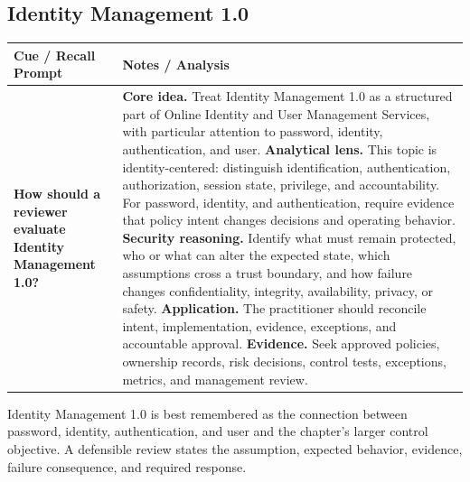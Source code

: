 \documentclass[11pt]{article}
\newcommand{\CornellHeader}{%
\rowcolor{Navy}\color{white}\bfseries Cue / Recall Prompt & \color{white}\bfseries Notes / Analysis\\\hline}
\newcommand{\CornellRow}[2]{%
\cellcolor{CueGray}\RaggedRight\textbf{#1} & \RaggedRight #2\\\hline}
\begin{document}
\subsection*{Identity Management 1.0}
\begin{longtable}{>{\RaggedRight\arraybackslash}p{}|>{\RaggedRight\arraybackslash}p{}}
\CornellHeader
\CornellRow{How should a reviewer evaluate Identity Management 1.0?}{\textbf{Core idea.} Treat Identity Management 1.0 as a structured part of Online Identity and User Management Services, with particular attention to password, identity, authentication, and user. \textbf{Analytical lens.} This topic is identity-centered: distinguish identification, authentication, authorization, session state, privilege, and accountability. For password, identity, and authentication, require evidence that policy intent changes decisions and operating behavior. \textbf{Security reasoning.} Identify what must remain protected, who or what can alter the expected state, which assumptions cross a trust boundary, and how failure changes confidentiality, integrity, availability, privacy, or safety. \textbf{Application.} The practitioner should reconcile intent, implementation, evidence, exceptions, and accountable approval. \textbf{Evidence.} Seek approved policies, ownership records, risk decisions, control tests, exceptions, metrics, and management review.}
\end{longtable}
\begin{topicsummary}
Identity Management 1.0 is best remembered as the connection between password, identity, authentication, and user and the chapter's larger control objective. A defensible review states the assumption, expected behavior, evidence, failure consequence, and required response.
\end{topicsummary}
\end{document}
